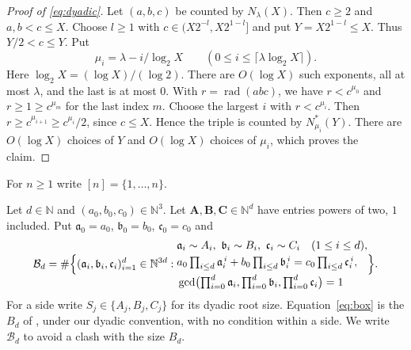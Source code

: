 \documentclass{amsart}
\numberwithin{equation}{section}
\numberwithin{table}{section}
\newcommand{\rad}{\operatorname{rad}}
\newcommand{\N}{\mathbb{N}}
\begin{document}
\begin{proof}[Proof of \eqref{eq:dyadic}]
Let $(a,b,c)$ be counted by $N_\lambda(X)$. Then $c\ge2$ and $a,b<c\le X$.
Choose $l\ge1$ with $c\in(X2^{-l},X2^{1-l}]$ and put
$Y=X2^{1-l}\le X$. Thus $Y/2<c\le Y$. Put
\[
\mu_i=\lambda-i/\log_2X\qquad
 (0\le i\le\lceil\lambda\log_2X\rceil).
\]
Here $\log_2X=(\log X)/(\log2)$.
There are $O(\log X)$ such exponents, all at most $\lambda$, and the last is
at most $0$. With $r=\rad(abc)$, we have
$r<c^{\mu_0}$ and $r\ge1\ge c^{\mu_m}$ for the last index $m$.
Choose the largest $i$ with $r<c^{\mu_i}$. Then
$r\ge c^{\mu_{i+1}}\ge c^{\mu_i}/2$, since $c\le X$.
Hence the triple is counted by $N^*_{\mu_i}(Y)$. There are $O(\log X)$ choices
of $Y$ and $O(\log X)$ choices of $\mu_i$, which proves the claim.
\end{proof}

For $n\ge1$ write $[n]=\{1,\ldots,n\}$.

Let $d\in\N$ and $(a_0,b_0,c_0)\in\N^3$. Let $\mathbf A,\mathbf B,\mathbf C\in\N^d$
have entries powers of two, $1$ included. Put $\mathfrak a_0=a_0$,
$\mathfrak b_0=b_0$, $\mathfrak c_0=c_0$ and
\begin{equation}\label{eq:box}
 \mathcal B_d=\#\Bigl\{(\mathfrak a_i,\mathfrak b_i,\mathfrak c_i)_{i=1}^d\in\N^{3d}:
 \begin{aligned}
  &\mathfrak a_i\sim A_i,\ \mathfrak b_i\sim B_i,\ \mathfrak c_i\sim C_i\quad(1\le i\le d),\\
  &a_0\textstyle\prod_{i\le d}\mathfrak a_i^{\,i}+b_0\prod_{i\le d}\mathfrak b_i^{\,i}
    =c_0\prod_{i\le d}\mathfrak c_i^{\,i},\\
  &\gcd\bigl(\textstyle\prod_{i=0}^{d}\mathfrak a_i,
    \prod_{i=0}^{d}\mathfrak b_i,\prod_{i=0}^{d}\mathfrak c_i\bigr)=1
 \end{aligned}\Bigr\}.
\end{equation}
For a side write $S_j\in\{A_j,B_j,C_j\}$ for its dyadic root size.
Equation~\eqref{eq:box} is the $B_d$ of \cite{BBLT}, under our dyadic
convention, with no condition within a side. We write $\mathcal B_d$ to avoid
a clash with the size $B_d$.
\end{document}
